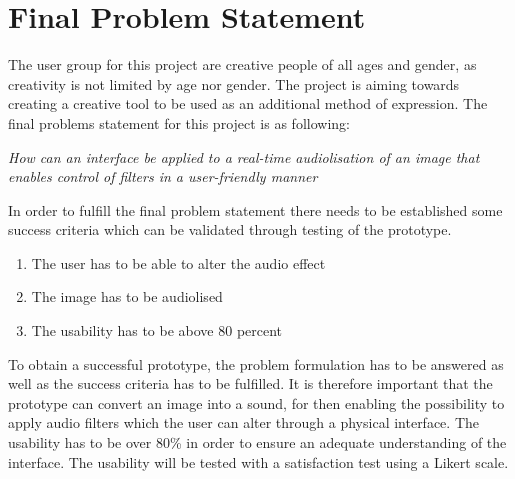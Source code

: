 \chapter{Final Problem Statement}\label{ch:finalproblem}

The user group for this project are creative people of all ages and gender, as creativity is not limited by age nor gender. The project is aiming towards creating a creative tool to be used as an additional method of expression. 
The final problems statement for this project is as following:



\textit{How can an interface be applied to a real-time audiolisation of an image that enables control of filters in a user-friendly manner}



In order to fulfill the final problem statement there needs to be established some success criteria which can be validated through testing of the prototype. 
\begin{enumerate}
\item The user has to be able to alter the audio effect
\item The image has to be audiolised 
\item The usability has to be above 80 percent
\end{enumerate}

To obtain a successful prototype, the problem formulation has to be answered as well as the success criteria has to be fulfilled. It is therefore important that the prototype can convert an image into a sound, for then enabling the possibility to apply audio filters which the user can alter through a physical interface. The usability has to be over 80\% in order to ensure an adequate understanding of the interface. The usability will be tested with a satisfaction test using a Likert scale.
